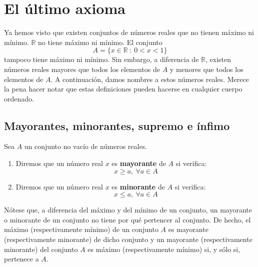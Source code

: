 \chapter{El último axioma}\label{chp:Tema4}
    
Ya hemos visto que existen conjuntos de números reales que no tienen máximo ni mínimo. $\mathbb{R}$ no tiene máximo ni mínimo. El conjunto
\begin{equation*}
    A=\{x \in \mathbb{R} ~:~ 0 < x < 1\}
\end{equation*}
tampoco tiene máximo ni mínimo. Sin embargo, a diferencia de $\mathbb{R}$, existen números reales mayores que todos los elementos de $A$ y menores que todos los elementos de $A$. A continuación, damos nombres a estos números reales. Merece la pena hacer notar que estas definiciones pueden hacerse en cualquier cuerpo ordenado.


\section{Mayorantes, minorantes, supremo e ínfimo}
\begin{definicion}
    Sea $A$ un conjunto no vacío de números reales.
    \begin{enumerate}
        \item Diremos que un número real $x$ es \textbf{mayorante} de $A$ si verifica:
        \begin{equation*}
            x \geq a,~\forall a \in A
        \end{equation*}

        \item Diremos que un número real $x$ es \textbf{minorante} de $A$ si verifica:
        \begin{equation*}
            x \leq a,~\forall a \in A
        \end{equation*}
    \end{enumerate}
\end{definicion}

Nótese que, a diferencia del máximo y del mínimo de un conjunto, un mayorante o minorante de un conjunto no tiene por qué pertencer al conjunto. De hecho, el máximo (respectivamente mínimo) de un conjunto $A$ es mayorante (respectivamente minorante) de dicho conjunto y un mayorante (respectivamente minorante) del conjunto $A$ es máximo (respectivamente mínimo) si, y sólo si, pertenece a $A$.\\


